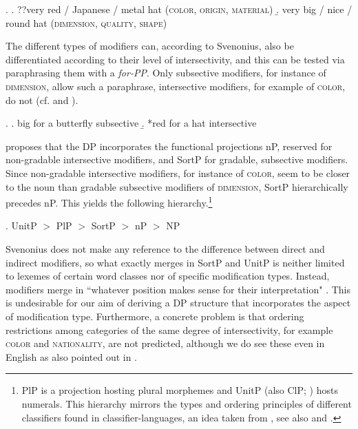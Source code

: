 \ex. \a. ??very red / Japanese / metal hat (\textsc{color}, \textsc{origin}, \textsc{material})
\b. very big / nice / round hat (\textsc{dimension}, \textsc{quality}, \textsc{shape})

The different types of modifiers can, according to Svenonius, also be differentiated according to their level of intersectivity, and this can be tested via paraphrasing them with a \textit{for-PP}. Only subsective modifiers, for instance of \textsc{dimension}, allow such a paraphrase, intersective modifiers, for example of \textsc{color}, do not (cf. \citealt{mckinney:2011:adj} and \citealt{cinque:2014:semantics}). 

\ex. \a. big for a butterfly \null \hfill subsective
\b. *red for a hat \null \hfill intersective

\citet[§ 4.3]{svenonius:2008:position} proposes that the DP incorporates the functional projections nP, reserved for non-gradable intersective modifiers, and SortP for gradable, subsective modifiers. Since non-gradable intersective modifiers, for instance of \textsc{color}, seem to be closer to the noun than gradable subsective modifiers of \textsc{dimension}, SortP hierarchically precedes nP. This yields the following hierarchy.\footnote{PlP is a projection hosting plural morphemes and UnitP (also ClP; \citealt{svenonius:2022:span}) hosts numerals. This hierarchy mirrors the types and ordering principles of different classifiers found in classifier-languages, an idea taken from \citet{borer:2005:in}, see also \citet{rijkhoff:2002:noun} and \citet{zamparelli:2000:layers}.}

\ex. UnitP $>$ PlP $>$ SortP $>$ nP $>$ NP \null \hfill \citep{svenonius:2008:position}

Svenonius does not make any reference to the difference between direct and indirect modifiers, so what exactly merges in SortP and UnitP is neither limited to lexemes of certain word classes nor of specific modification types. Instead, modifiers merge in ``whatever position makes sense for their interpretation" \citep[39]{svenonius:2008:position}. This is undesirable for our aim of deriving a DP structure that incorporates the aspect of modification type. Furthermore, a concrete problem is that ordering restrictions among categories of the same degree of intersectivity, for example \textsc{color} and \textsc{nationality}, are not predicted, although we do see these even in English as also pointed out in \citet{panayidou:2013:in}.

